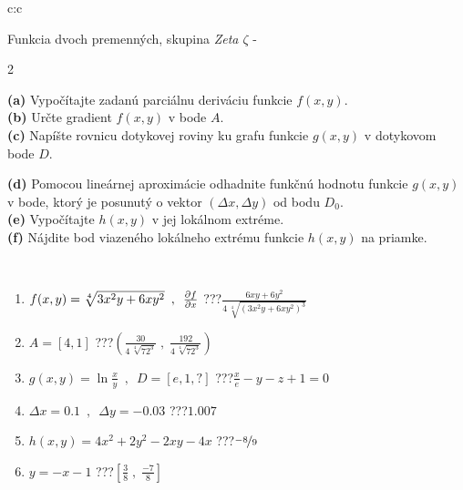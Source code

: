 \documentclass[10pt]{report}
\begin{document}
\begin{tabular}{c:c}
\begin{minipage}[c][104.5mm][t]{0.5\linewidth}
\begin{center}
\vspace{7mm}
{\huge \LARGE Funkcia dvoch premenných, skupina \textit{Zeta $\zeta$} -}\\[5mm]
\begin{minipage}{0.95\linewidth}
\begin{center}
{\small \begin{multicols}{2} \raggedright
\textbf{(a)} Vypočítajte zadanú parciálnu deriváciu funkcie \(f(x,y)\). \\[1mm]
\textbf{(b)} Určte gradient \(f(x,y)\) v bode \(A\). \\[1mm]
\textbf{(c)} Napíšte rovnicu dotykovej roviny ku grafu funkcie \(g(x,y)\) v dotykovom bode \(D\). \par \columnbreak
\textbf{(d)} Pomocou lineárnej aproximácie odhadnite funkčnú hodnotu funkcie \(g(x,y)\) v bode, ktorý je posunutý o vektor \((\Delta x, \Delta y)\) od bodu \(D_0\). \\[1mm]
\textbf{(e)} Vypočítajte \(h(x,y)\) v jej lokálnom extréme. \\[1mm]
\textbf{(f)} Nájdite bod viazeného lokálneho extrému funkcie \(h(x,y)\) na priamke. \\[1mm]
\end{multicols}
}
\end{center}
\end{minipage}
\\[4mm]
\begin{minipage}{0.79\linewidth}
\begin{center}
\begin{varwidth}{\linewidth}
\begin{enumerate}
\normalsizerr
\item $f(x,y) = \sqrt[4]{3x^2y + 6xy^2}\enspace , \enspace \pdv{f}{x}$\quad \dotfill\; ???\;\dotfill \quad $\frac{6xy+6y^2}{4\,\sqrt[4]{(3x^2y+6xy^2)^{3}}}$
\item $A = [4, 1]$\quad \dotfill\; ???\;\dotfill \quad $\left( \frac{30}{4\,\sqrt[4]{72^3}} \;,\; \frac{192}{4\,\sqrt[4]{72^3}} \right)$
\item $g(x,y) = \ln\frac{x}{y} \enspace , \enspace D=[e,1,?]$\quad \dotfill\; ???\;\dotfill \quad $\frac{x}{e} - y - z + 1 = 0$
\item $\Delta x = {0.1} \enspace,\enspace \Delta y = {-0.03}$\quad \dotfill\; ???\;\dotfill \quad $1.007$
\item $h(x,y) = 4x^2+2y^2-2xy-4x$\quad \dotfill\; ???\;\dotfill \quad $\nicefrac{-8}{9}$
\item $y = -x-1$\quad \dotfill\; ???\;\dotfill \quad $\left[\frac{3}{8}\;,\;\frac{-7}{8}\right]$

\end{enumerate}
\end{varwidth}
\end{center}
\end{minipage}
\end{center}
\end{minipage}
\end{tabular}
\end{document}
